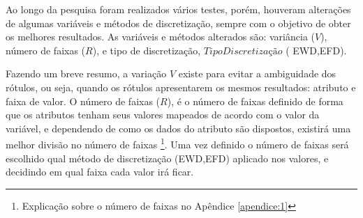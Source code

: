 Ao longo da pesquisa foram realizados vários testes, porém, houveram alterações de algumas variáveis e métodos de discretização, sempre com o objetivo de obter os melhores resultados. As variáveis e métodos alterados são: variância (${V}$), número de faixas (${R}$), e tipo de discretização, ${TipoDiscretização}$ ( EWD,EFD). 

Fazendo um breve resumo, a variação ${V}$ existe para evitar a ambiguidade dos rótulos, ou seja, quando os rótulos apresentarem os mesmos resultados: atributo e faixa de valor. O número de faixas (${R}$), é o número de faixas definido de forma que os atributos tenham seus valores mapeados de acordo com o valor da variável, e dependendo de como os dados do atributo são dispostos, existirá uma melhor divisão no número de faixas \footnote{Explicação sobre o número de faixas no Apêndice \ref{apendice:1}}. Uma vez definido o número de faixas será escolhido qual método de discretização (EWD,EFD) aplicado nos valores, e decidindo em qual faixa cada valor irá ficar.  






